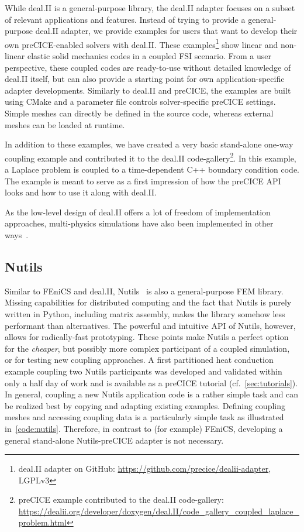 While deal.II is a general-purpose library, the deal.II adapter focuses on a subset of relevant applications and features. Instead of trying to provide a general-purpose deal.II adapter, we provide examples for users that want to develop their own preCICE-enabled solvers with deal.II.
These examples\footnote{deal.II adapter on GitHub: \url{https://github.com/precice/dealii-adapter}, LGPLv3} show
linear and non-linear elastic solid mechanics codes in a coupled FSI scenario. From a user perspective, these coupled codes are ready-to-use without detailed knowledge of deal.II itself, but can also provide a starting point for own application-specific adapter developments.
Similarly to deal.II and preCICE, the examples are built using CMake and a parameter file controls solver-specific preCICE settings. Simple meshes can directly be defined in the source code, whereas external meshes can be loaded at runtime.

In addition to these examples, we have created a very basic stand-alone one-way coupling example and contributed it to the deal.II code-gallery\footnote{preCICE example contributed to the deal.II code-gallery:\\ \url{https://dealii.org/developer/doxygen/deal.II/code\_gallery\_coupled\_laplace\_problem.html}}. In this example, a Laplace problem is coupled to a time-dependent C++ boundary condition code. The example is meant to serve as a first impression of how the preCICE API looks and how to use it along with deal.II.

As the low-level design of deal.II offers a lot of freedom of implementation approaches, multi-physics simulations have also been implemented in other ways~\cite{ExaDG2020, wick2013}. 

\subsection{Nutils} 

Similar to FEniCS and deal.II, Nutils~\cite{Nutils} is also a general-purpose FEM library. 
Missing capabilities for distributed computing and the fact that Nutils is purely written in Python, including matrix assembly, makes the library somehow less performant than alternatives. The powerful and intuitive API of Nutils, however, allows for radically-fast prototyping. These points make Nutils a perfect option for the \textit{cheaper}, but possibly more complex participant of a coupled simulation, or for testing new coupling approaches.
A first partitioned heat conduction example coupling two Nutils participants was developed and validated within only a half day of work and is available as a preCICE tutorial (cf.~\autoref{sec:tutorials}). 
In general, coupling a new Nutils application code is a rather simple task and can be realized best by copying and adapting existing examples.
Defining coupling meshes and accessing coupling data is a particularly simple task  as illustrated in~\autoref{code:nutils}.
Therefore, in contrast to (for example) FEniCS, developing a general stand-alone Nutils-preCICE adapter is not necessary. 

